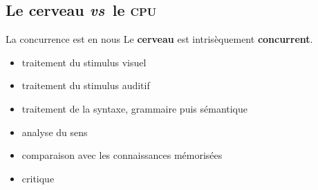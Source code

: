 \documentclass{beamer}
\begin{document}
\subsection{Le cerveau \textit{vs}\, le \textsc{cpu}}
\begin{frame}{La concurrence est en nous}
  Le \textbf{cerveau} est intrisèquement \textbf{concurrent}.
  \par\bigskip
  \begin{minipage}{.6\textwidth}
    \begin{itemize}
    \item<2-> traitement du stimulus visuel
    \item<3-> traitement du stimulus auditif
    \item<4-> traitement de la syntaxe, grammaire puis sémantique
    \item<5-> analyse du sens
    \item<6-> comparaison avec les connaissances mémorisées
    \item<7-> critique
    \end{itemize}
  \end{minipage}
\end{frame} %
\end{document}
